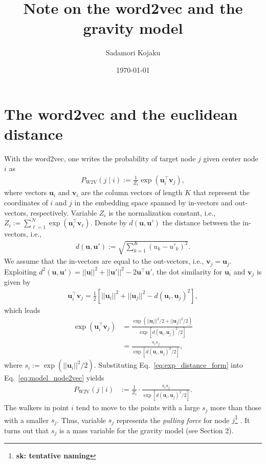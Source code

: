 \documentclass[12pt]{article} %
\def\given{\mid}
\def\vec#1{{\bm #1}}
\def\sada#1{\footnote{\color{light-blue}\textbf{sk: #1}} }
\begin{document}

\title{Note on the word2vec and the gravity model} %
\date{\today}
\author{Sadamori Kojaku}
\maketitle %

\section{The word2vec and the euclidean distance}

With the word2vec, one writes the probability of target node $j$ given center node $i$ as 
\begin{align}
  \label{eq:model_node2vec}
    P_{\text{W2V}}\left(j \given i\right) := \frac{1}{Z_i}\exp\left(\vec{u} ^\top _{i} \vec{v}_{j}\right), 
\end{align}
where vectors $\vec{u}_i$ and $\vec{v}_i$ are the column vectors of length $K$ that represent the coordinates of $i$ and $j$ in the embedding space spanned by in-vectors and out-vectors, respectively.
Variable $Z_i$ is the normalization constant, i.e., $Z_i:= \sum_{\ell=1}^N \exp\left(\vec{u} ^\top _{i} \vec{v}_{\ell}\right)$. 
Denote by $d(\vec{u},\vec{u}')$ the distance between the in-vectors, i.e., 
\begin{align}
    \label{eq:distance}
    d(\vec{u},\vec{u}'):= \sqrt{\sum_{k=1}^K \left(u_{k} - u'_{k}\right)^2}.
\end{align}
We assume that the in-vectors are equal to the out-vectors, i.e., $\vec{v}_j = \vec{u}_j$.
Exploiting $d^2 (\vec{u},\vec{u}')=||\vec{u}||^2 + ||\vec{u}'||^2 - 2\vec{u} ^\top \vec{u}'$, the dot similarity for $\vec{u}_i$ and $\vec{v}_j$ is given by 
\begin{align}
    \label{eq:dotsim}
    \vec{u}_i ^\top \vec{v}_j = \frac{1}{2}\left[ ||\vec{u}_i||^2 + ||\vec{u}_j||^2 - d\left(\vec{u}_i, \vec{u}_j\right)^2 \right],
\end{align}
which leads 
\begin{align}
    \exp\left( \vec{u}_i ^\top \vec{v}_j \right) &= \frac{\exp\left( ||\vec{u}_i||^2/2 + ||\vec{u}_j||^2/2 \right)}{\exp\left[ d\left(\vec{u}_i, \vec{u}_j\right)^2 / 2 \right]} \nonumber \\
                                                 &= \frac{s_i s_j}{\exp\left[d\left(\vec{u}_i, \vec{u}_j\right)^2 / 2\right]}, \label{eq:exp_distance_form}
\end{align}
where $s_i:=\exp(||\vec{u} _i||^2/2)$. 
Substituting Eq.~\eqref{eq:exp_distance_form} into Eq.~\eqref{eq:model_node2vec} yields
\begin{align}
    \label{eq:model_node2vec_distance}
    P_{\text{W2V}}\left(j \given i\right) &:= \frac{1}{Z_i}\cdot \frac{s_is_j}{\exp\left[d\left(\vec{u}_i, \vec{u}_j\right)^2/2\right]}. 
\end{align}
The walkers in point $i$ tend to move to the points with a large $s_j$ more than those with a smaller $s_j$.
Thus, variable $s_j$ represents the {\it pulling force} for node $j$\sada{tentative naming}. 
It turns out that $s_j$ is a mass variable for the gravity model (see Section 2). 
\end{document}
